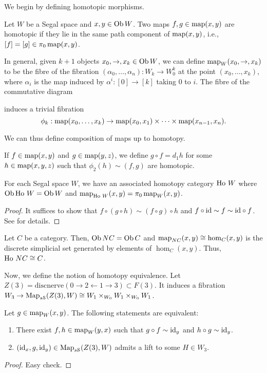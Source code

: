 \begin{refsection}
We begin by defining homotopic morphisms.
\begin{defin}
Let $W$ be a Segal space and $x,y\in\operatorname{Ob} W$. Two maps $f,g\in\operatorname{\mathrm{map}}(x,y)$ are homotopic if they lie in the same path component of $\operatorname{\mathrm{map}}(x,y)$, i.e., $[f]=[g]\in\pi_0\operatorname{\mathrm{map}}(x,y)$.
\end{defin}

In general, given $k+1$ objects $x_0,\to,x_k\in\operatorname{Ob} W$, we can define $\operatorname{\mathrm{map}}_W(x_0,\to,x_k)$ to be the fibre of the fibration $(\alpha_0,\ldots,\alpha_n):W_k\to W_0^k$ at the point $(x_0,\ldots,x_k)$, where $\alpha_i$ is the map induced by $\alpha^i:[0]\to[k]$ taking 0 to $i$. The fibre of the commutative diagram

\centerline{}

induces a trivial fibration
$$\phi_k:\operatorname{\mathrm{map}}(x_0,\ldots,x_k)\to\operatorname{\mathrm{map}}(x_0,x_1)\times\cdots\times\operatorname{\mathrm{map}}(x_{n-1},x_n).$$

We can thus define composition of maps up to homotopy.
\begin{defin}
If $f\in\operatorname{\mathrm{map}}(x,y)$ and $g\in\operatorname{\mathrm{map}}(y,z)$, we define $g\circ f=d_1h$ for some $h\in\operatorname{\mathrm{map}}(x,y,z)$ such that $\phi_2(h)\sim(f,g)$ are homotopic.
\end{defin}

\begin{prop}
For each Segal space $W$, we have an associated homotopy category $\operatorname{\mathrm{Ho} \,} W$ where $\operatorname{Ob}\operatorname{\mathrm{Ho} \,} W=\operatorname{Ob} W$ and $\operatorname{\mathrm{map}}_{\operatorname{\mathrm{Ho} \,} W}(x,y)=\pi_0\operatorname{\mathrm{map}}_W(x,y)$.
\end{prop}
\begin{proof}
It suffices to show that $f\circ(g\circ h)\sim(f\circ g)\circ h$ and $f\circ\mathrm{id}\sim f\sim\mathrm{id}\circ f$. See \cite[Prop 5.4]{rezk} for details.
\end{proof}

\begin{eg}
Let $C$ be a category. Then, $\operatorname{Ob} NC=\operatorname{Ob} C$ and $\operatorname{\mathrm{map}}_{NC}(x,y)\cong\hom_C(x,y)$ is the discrete simplicial set generated by elements of $\hom_C(x,y)$. Thus, $\operatorname{\mathrm{Ho} \,} NC\cong C$.
\end{eg}

Now, we define the notion of homotopy equivalence. Let $Z(3)=\mathrm{discnerve}(0\to2\leftarrow1\to3)\subset F(3)$. It induces a fibration $W_3\to\operatorname{\mathrm{Map}}_{s\mathcal S}(Z(3),W)\cong W_1\times_{W_0}W_1\times_{W_0}W_1$.

\begin{prop}
Let $g\in\operatorname{\mathrm{map}}_W(x,y)$. The following statements are equivalent:
\begin{enumerate}
\item There exist $f,h\in\operatorname{\mathrm{map}}_W(y,x)$ such that $g\circ f\sim\mathrm{id}_y$ and $h\circ g\sim\mathrm{id}_y$.
\item $(\mathrm{id}_x,g,\mathrm{id}_y)\in\operatorname{\mathrm{Map}}_{s\mathcal S}(Z(3),W)$ admits a lift to some $H\in W_3$.
\end{enumerate}
\end{prop}
\begin{proof}
Easy check.
\end{proof}


\end{refsection}

